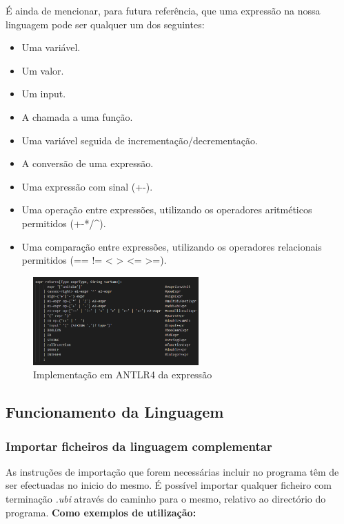 \documentclass[10pt,portuguese]{article}
\begin{document}
\par É ainda de mencionar, para futura referência, que uma expressão na nossa linguagem pode ser qualquer um dos seguintes:
\begin{itemize}
    \item Uma variável.
	\item Um valor.
	\item Um input.
    \item A chamada a uma função.
	\item Uma variável seguida de incrementação/decrementação.
	\item A conversão de uma expressão.
	\item Uma expressão com sinal (+-).
	\item Uma operação entre expressões, utilizando os operadores aritméticos permitidos (+-*/\string^).
	\item Uma comparação entre expressões, utilizando os operadores relacionais permitidos (== != < > <= >=).
\end{itemize}
\begin{figure}[h]
\centering
\includegraphics[width=0.565\textwidth]{images/expr.png}
\caption{Implementação em ANTLR4 da expressão}
\end{figure}
\subsection{Funcionamento da Linguagem}

\subsubsection{Importar ficheiros da linguagem complementar}
\par As instruções de importação que forem necessárias incluir no programa têm de ser efectuadas no inicio do mesmo. É possível importar qualquer ficheiro com terminação \emph{.ubi} através do caminho para o mesmo, relativo ao directório do programa.
\textbf{Como exemplos de utilização:}
\end{document}
